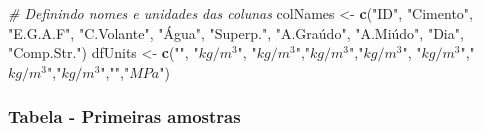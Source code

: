 \documentclass[]{article}
\newenvironment{Shaded}{\begin{snugshade}}{\end{snugshade}}
\newcommand{\CharTok}[1]{\textcolor[rgb]{0.31,0.60,0.02}{#1}}
\newcommand{\CommentTok}[1]{\textcolor[rgb]{0.56,0.35,0.01}{\textit{#1}}}
\newcommand{\DataTypeTok}[1]{\textcolor[rgb]{0.13,0.29,0.53}{#1}}
\newcommand{\DecValTok}[1]{\textcolor[rgb]{0.00,0.00,0.81}{#1}}
\newcommand{\KeywordTok}[1]{\textcolor[rgb]{0.13,0.29,0.53}{\textbf{#1}}}
\newcommand{\NormalTok}[1]{#1}
\newcommand{\OperatorTok}[1]{\textcolor[rgb]{0.81,0.36,0.00}{\textbf{#1}}}
\newcommand{\StringTok}[1]{\textcolor[rgb]{0.31,0.60,0.02}{#1}}
\begin{document}
\begin{Shaded}
\begin{Highlighting}[]
\CommentTok{# Definindo nomes e unidades das colunas}
\NormalTok{colNames <-}\StringTok{ }\KeywordTok{c}\NormalTok{(}\StringTok{"ID"}\NormalTok{, }\StringTok{"Cimento"}\NormalTok{, }\StringTok{"E.G.A.F"}\NormalTok{, }\StringTok{"C.Volante"}\NormalTok{, }\StringTok{"Água"}\NormalTok{,}
             \StringTok{"Superp."}\NormalTok{, }\StringTok{"A.Graúdo", "}\NormalTok{A.Miúdo", }\StringTok{"Dia"}\NormalTok{, }\StringTok{"Comp.Str."}\NormalTok{)}
\NormalTok{dfUnits <-}\StringTok{ }\KeywordTok{c}\NormalTok{(}\StringTok{""}\NormalTok{, }\StringTok{"$kg/m^3$"}\NormalTok{, }\StringTok{"$kg/m^3$"}\NormalTok{,}\StringTok{"$kg/m^3$"}\NormalTok{,}\StringTok{"$kg/m^3$"}\NormalTok{,}
             \StringTok{"$kg/m^3$"}\NormalTok{,}\StringTok{"$kg/m^3$"}\NormalTok{,}\StringTok{"$kg/m^3$"}\NormalTok{,}\StringTok{""}\NormalTok{,}\StringTok{"$MPa$"}\NormalTok{)}
\end{Highlighting}
\end{Shaded}

\hypertarget{tabela---primeiras-amostras}{%
\subsubsection{Tabela - Primeiras
amostras}\label{tabela---primeiras-amostras}}

\label{show-first-samples}

\begin{Shaded}
\end{Shaded}
\end{document}
